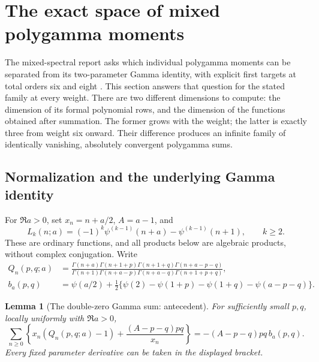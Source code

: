 \documentclass[11pt,a4paper]{article}
\numberwithin{equation}{section}
\newtheorem{lemma}[theorem]{Lemma}
\theoremstyle{definition}
\theoremstyle{remark}
\begin{document}

\section{The exact space of mixed polygamma moments}
\label{sec:bell}

The mixed-spectral report asks which individual polygamma moments can
be separated from its two-parameter Gamma identity, with explicit first
targets at total orders six and eight \cite{RepoMixed}. This section
answers that question for the stated family at every weight. There are
two different dimensions to compute: the dimension of its formal
polynomial rows, and the dimension of the functions obtained after
summation. The former grows with the weight; the latter is exactly three
from weight six onward. Their difference produces an infinite family of
identically vanishing, absolutely convergent polygamma sums.

\subsection{Normalization and the underlying Gamma identity}

For $\Re a>0$, set $x_n=n+a/2$, $A=a-1$, and
\begin{equation}
 L_k(n;a)=(-1)^k\psi^{(k-1)}(n+a)-\psi^{(k-1)}(n+1),
 \qquad k\ge2.
 \label{bell:lambda}
\end{equation}
These are ordinary functions, and all products below are algebraic
products, without complex conjugation. Write
\begin{align}
 Q_n(p,q;a)
 &=\frac{\Gamma(n+a)\Gamma(n+1+p)\Gamma(n+1+q)
              \Gamma(n+a-p-q)}
 {\Gamma(n+1)\Gamma(n+a-p)\Gamma(n+a-q)
              \Gamma(n+1+p+q)},\label{bell:Q}\\
 b_a(p,q)
 &=\psi(a/2)+\tfrac12\{\psi(2)-\psi(1+p)-\psi(1+q)
                                      -\psi(a-p-q)\}.
 \label{bell:b}
\end{align}

\begin{lemma}[The double-zero Gamma sum: antecedent]
\label{bell:antecedent}
For sufficiently small $p,q$, locally uniformly with $\Re a>0$,
\begin{equation}
 \sum_{n\ge0}\left\{x_n(Q_n(p,q;a)-1)
             +\frac{(A-p-q)pq}{x_n}\right\}
             =-(A-p-q)pq\,b_a(p,q).
 \label{bell:master}
\end{equation}
Every fixed parameter derivative can be taken in the displayed bracket.
\end{lemma}
\end{document}
